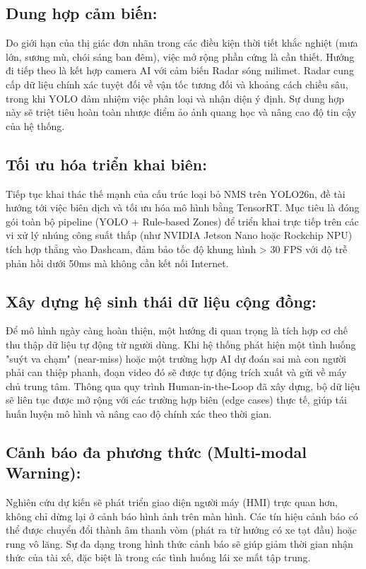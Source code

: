 	\subsection{Dung hợp cảm biến:}
	Do giới hạn của thị giác đơn nhãn trong các điều kiện thời tiết khắc nghiệt (mưa lớn, sương mù, chói sáng ban đêm), việc mở rộng phần cứng là cần thiết. Hướng đi tiếp theo là kết hợp camera AI với cảm biến Radar sóng milimet. Radar cung cấp dữ liệu chính xác tuyệt đối về vận tốc tương đối và khoảng cách chiều sâu, trong khi YOLO đảm nhiệm việc phân loại và nhận diện ý định. Sự dung hợp này sẽ triệt tiêu hoàn toàn nhược điểm ảo ảnh quang học và nâng cao độ tin cậy của hệ thống.
	
	\subsection{Tối ưu hóa triển khai biên:}
	Tiếp tục khai thác thế mạnh của cấu trúc loại bỏ NMS trên YOLO26n, đề tài hướng tới việc biên dịch và tối ưu hóa mô hình bằng TensorRT. Mục tiêu là đóng gói toàn bộ pipeline (YOLO + Rule-based Zones) để triển khai trực tiếp trên các vi xử lý nhúng công suất thấp (như NVIDIA Jetson Nano hoặc Rockchip NPU) tích hợp thẳng vào Dashcam, đảm bảo tốc độ khung hình > 30 FPS với độ trễ phản hồi dưới 50ms mà không cần kết nối Internet.

	\subsection{Xây dựng hệ sinh thái dữ liệu cộng đồng:}
	Để mô hình ngày càng hoàn thiện, một hướng đi quan trọng là tích hợp cơ chế thu thập dữ liệu tự động từ người dùng. Khi hệ thống phát hiện một tình huống "suýt va chạm" (near-miss) hoặc một trường hợp AI dự đoán sai mà con người phải can thiệp phanh, đoạn video đó sẽ được tự động trích xuất và gửi về máy chủ trung tâm. Thông qua quy trình Human-in-the-Loop đã xây dựng, bộ dữ liệu sẽ liên tục được mở rộng với các trường hợp biên (edge cases) thực tế, giúp tái huấn luyện mô hình và nâng cao độ chính xác theo thời gian.

	\subsection{Cảnh báo đa phương thức (Multi-modal Warning):}
	Nghiên cứu dự kiến sẽ phát triển giao diện người máy (HMI) trực quan hơn, không chỉ dừng lại ở cảnh báo hình ảnh trên màn hình. Các tín hiệu cảnh báo có thể được chuyển đổi thành âm thanh vòm (phát ra từ hướng có xe tạt đầu) hoặc rung vô lăng. Sự đa dạng trong hình thức cảnh báo sẽ giúp giảm thời gian nhận thức của tài xế, đặc biệt là trong các tình huống lái xe mất tập trung.